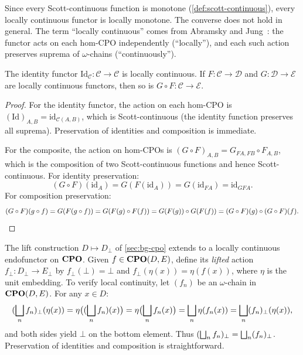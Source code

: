 Since every Scott-continuous function is monotone
(\cref{def:scott-continuous}), every locally continuous functor is
locally monotone. The converse does not hold in general. The term
``locally continuous'' comes from Abramsky and
Jung~\cite[\S5.2]{AJ1994}: the functor acts on each hom-CPO
independently (``locally''), and each such action preserves suprema of
$\omega$-chains (``continuously'').

\begin{proposition}
\label{prop:lc-functor-closure}
The identity functor
$\mathrm{Id}_{\mathcal{C}} : \mathcal{C} \to \mathcal{C}$ is locally
continuous. If $F : \mathcal{C} \to \mathcal{D}$ and
$G : \mathcal{D} \to \mathcal{E}$ are locally continuous functors, then
so is $G \circ F : \mathcal{C} \to \mathcal{E}$.
\end{proposition}

\begin{proof}
For the identity functor, the action on each hom-CPO is
$(\mathrm{Id})_{A,B} = \mathrm{id}_{\mathcal{C}(A,B)}$, which is
Scott-continuous (the identity function preserves all suprema).
Preservation of identities and composition is immediate.

For the composite, the action on hom-CPOs is
$(G \circ F)_{A,B} = G_{FA,FB} \circ F_{A,B}$, which is the composition
of two Scott-continuous functions and hence Scott-continuous. For
identity preservation:
\[
  (G \circ F)(\mathrm{id}_A)
    = G(F(\mathrm{id}_A))
    = G(\mathrm{id}_{FA})
    = \mathrm{id}_{GFA}.
\]
For composition preservation:
\[
  (G \circ F)(g \circ f)
    = G(F(g \circ f))
    = G(F(g) \circ F(f))
    = G(F(g)) \circ G(F(f))
    = (G \circ F)(g) \circ (G \circ F)(f). \qedhere
\]
\end{proof}

\begin{example}
\label{ex:lc-functor-lift}
The lift construction $D \mapsto D_\bot$ of \cref{sec:bg-cpo} extends
to a locally continuous endofunctor on $\mathbf{CPO}$. Given
$f \in \mathbf{CPO}(D, E)$, define its \emph{lifted} action
$f_\bot : D_\bot \to E_\bot$ by $f_\bot(\bot) = \bot$ and
$f_\bot(\eta(x)) = \eta(f(x))$, where $\eta$ is the unit embedding.
To verify local continuity, let $(f_n)$ be an $\omega$-chain in
$\mathbf{CPO}(D,E)$. For any $x \in D$:
\[
  (\bigsqcup_n f_n)_\bot(\eta(x))
    = \eta\bigl((\bigsqcup_n f_n)(x)\bigr)
    = \eta\bigl(\bigsqcup_n f_n(x)\bigr)
    = \bigsqcup_n \eta(f_n(x))
    = \bigsqcup_n (f_n)_\bot(\eta(x)),
\]
and both sides yield $\bot$ on the bottom element. Thus
$(\bigsqcup_n f_n)_\bot = \bigsqcup_n (f_n)_\bot$. Preservation of identities
and composition is straightforward.
\end{example}

